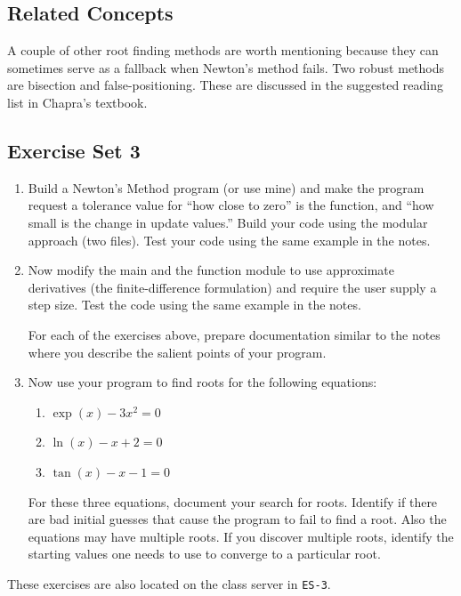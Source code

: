 \subsection{Related Concepts}
A couple of other root finding methods are worth mentioning because they can sometimes serve as a fallback when Newton's method fails.   Two robust methods are bisection and false-positioning. These are discussed in the suggested reading list in Chapra's textbook.

\clearpage
\subsection{Exercise Set 3}
\begin{enumerate}
\item Build a Newton's Method program (or use mine) and make the program request a tolerance value for ``how close to zero'' is the function, and ``how small is the change in update values.''  Build your code using the modular approach (two files).  Test your code using the same example in the notes.

\item Now modify the main and the function module to use approximate derivatives (the finite-difference formulation) and require the user supply a step size.   Test the code using the same example in the notes.

For each of the exercises above, prepare documentation similar to the notes where you describe the salient points of your program.   

\item  Now use your program to find roots for the following equations:
\begin{enumerate}
\item $\exp(x) - 3x^2 =0$ \\
\item $\ln(x) - x + 2 = 0$ \\
\item $\tan(x) - x - 1 = 0$ \\
\end{enumerate}
For these three equations, document your search for roots.  Identify if there are bad initial guesses that cause the program to fail to find a root.   Also the equations may have multiple roots.  If you discover multiple roots, identify the starting values one needs to use to converge to a particular root.


\end{enumerate}

These exercises are also located on the class server in \texttt{ES-3}.

